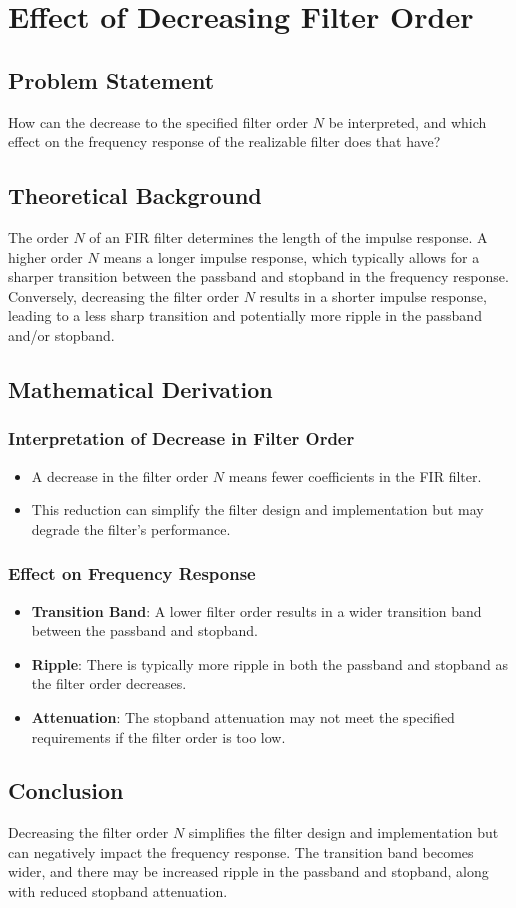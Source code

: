 \item[(d)]
\section{Effect of Decreasing Filter Order}

\subsection*{Problem Statement}
How can the decrease to the specified filter order \( N \) be interpreted, and which effect on the frequency response of the realizable filter does that have?

\subsection*{Theoretical Background}
The order \( N \) of an FIR filter determines the length of the impulse response. A higher order \( N \) means a longer impulse response, which typically allows for a sharper transition between the passband and stopband in the frequency response. Conversely, decreasing the filter order \( N \) results in a shorter impulse response, leading to a less sharp transition and potentially more ripple in the passband and/or stopband.

\subsection*{Mathematical Derivation}

\subsubsection*{Interpretation of Decrease in Filter Order}
\begin{itemize}
    \item A decrease in the filter order \( N \) means fewer coefficients in the FIR filter.
    \item This reduction can simplify the filter design and implementation but may degrade the filter's performance.
\end{itemize}

\subsubsection*{Effect on Frequency Response}
\begin{itemize}
    \item \textbf{Transition Band}: A lower filter order results in a wider transition band between the passband and stopband.
    \item \textbf{Ripple}: There is typically more ripple in both the passband and stopband as the filter order decreases.
    \item \textbf{Attenuation}: The stopband attenuation may not meet the specified requirements if the filter order is too low.
\end{itemize}

\subsection*{Conclusion}
Decreasing the filter order \( N \) simplifies the filter design and implementation but can negatively impact the frequency response. The transition band becomes wider, and there may be increased ripple in the passband and stopband, along with reduced stopband attenuation.
